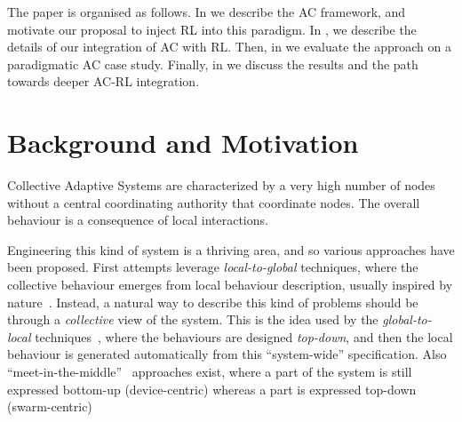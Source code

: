 \documentclass[conference]{IEEEtran}
\begin{document}
The paper is organised as follows. 
%
In  we describe
 the AC framework, %
 and motivate our proposal to inject RL into this paradigm. 
 In , we describe the details of our integration of AC with RL.
Then, in   we evaluate the approach on a paradigmatic AC case study.
%
Finally, in  we discuss the results and the path towards deeper AC-RL integration.

 \section{Background and Motivation}\label{background}


Collective Adaptive Systems are characterized by a very high number of nodes without a central coordinating authority that coordinate nodes. 
 The overall behaviour is a consequence of local interactions.%
 
Engineering this kind of system is a thriving area, and so various approaches have been proposed.
 First attempts leverage \textit{local-to-global} techniques, where the collective behaviour emerges from local behaviour description, 
 usually inspired by nature~\cite{DBLP:journals/swarm/BrambillaFBD13}. 
%
Instead, a natural way to describe this kind of problems should be through a \textit{collective} view of the system.
 This is the idea used by the \textit{global-to-local} techniques~\cite{DBLP:journals/jlap/ViroliBDACP19,DBLP:journals/scp/AlrahmanNL20, DBLP:conf/cbse/BuresGHKKP13}, 
 where the behaviours are designed \textit{top-down}, and then the local behaviour is generated automatically from this ``system-wide'' specification. 
% 
Also ``meet-in-the-middle''~\cite{DBLP:journals/computer/PinciroliB16} approaches exist, where
 a part of the system is still expressed bottom-up (device-centric) whereas a part is expressed top-down (swarm-centric)
\end{document}
